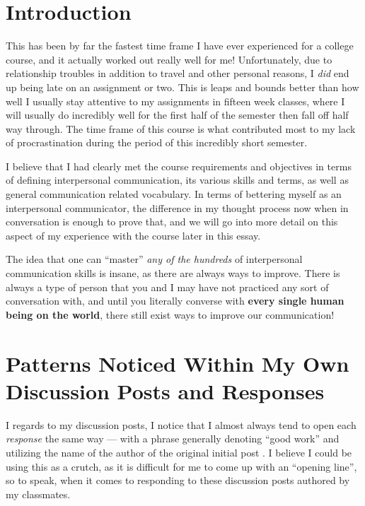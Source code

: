 
\section{Introduction}
  This has been by far the fastest time frame I have ever experienced for a
    college course, and it actually worked out really well for me!
    Unfortunately, due to relationship troubles in addition to travel and other
    personal reasons, I \textit{did} end up being late on an assignment or two.
    This is leaps and bounds better than how well I usually stay attentive
    to my assignments in fifteen week classes, where I will usually do
    incredibly well for the first half of the semester then fall off half way
    through. The time frame of this course is what contributed most to my
    lack of procrastination during the period of this incredibly short semester.

  I believe that I had clearly met the course requirements and objectives in
    terms of defining interpersonal communication, its various skills and terms,
    as well as general communication related vocabulary. In terms of bettering
    myself as an interpersonal communicator, the difference in my thought
    process now when in conversation is enough to prove that, and we will go
    into more detail on this aspect of my experience with the course later in
    this essay.

  The idea that one can ``master'' \textit{any of the hundreds} of interpersonal
    communication skills is insane, as there are always ways to improve. There
    is always a type of person that you and I may have not practiced any sort
    of conversation with, and until you literally converse with \textbf{every
    single human being on the world}, there still exist ways to improve our
    communication!


\section{Patterns Noticed Within My Own Discussion Posts and Responses}
  I regards to my discussion posts, I notice that I almost always tend to open
    each \textit{response} the same way --- with a phrase generally denoting
    ``good work'' and utilizing the name of the author of the original initial
    post \parencite{%
    hellwig_julayne_2020,hellwig_cherylee_2020,hellwig_kristyna_2020%
    }. I believe I could be using this as a crutch, as it is difficult for me
    to come up with an ``opening line'', so to speak, when it comes to
    responding to these discussion posts authored by my classmates.

